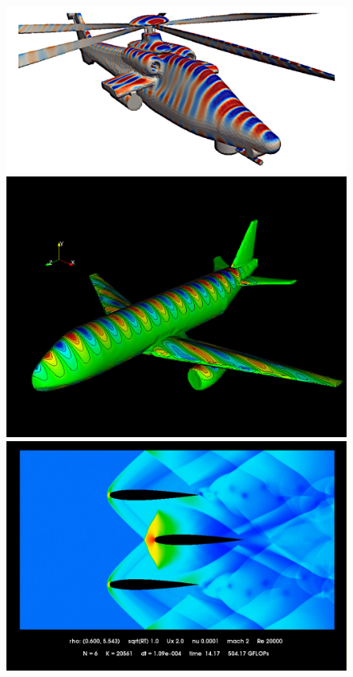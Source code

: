 \documentclass[compress]{beamer}
\begin{document}
{\begin{figure}
\begin{overlayarea}{\textwidth}{.65\textheight}
{\includegraphics[height=.25\textheight]{figs/helicopter.png}
\includegraphics[height=.25\textheight]{figs/airplane.png}\\
\includegraphics[height=.25\textheight]{figs/trifoil.png}
}
\end{overlayarea}
\end{figure}}
\end{document}
